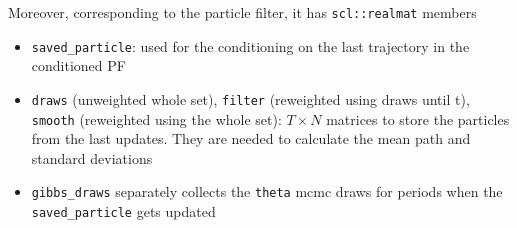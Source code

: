 \documentclass[11pt, letterpaper, notitlepage]{article}
\begin{document}
Moreover, corresponding to the particle filter, it has \texttt{scl::realmat} members
\begin{itemize}
\item \texttt{saved\_particle}: used for the conditioning on the last trajectory in the conditioned PF
\item \texttt{draws} (unweighted whole set), \texttt{filter} (reweighted using draws until t), \texttt{smooth} (reweighted using the whole set): $T\times N$ matrices to store the particles from the last updates. They are needed to calculate the mean path and standard deviations
\item \texttt{gibbs\_draws} separately collects the \texttt{theta} mcmc draws for periods when the \texttt{saved\_particle} gets updated 
\end{itemize}
\end{document}
